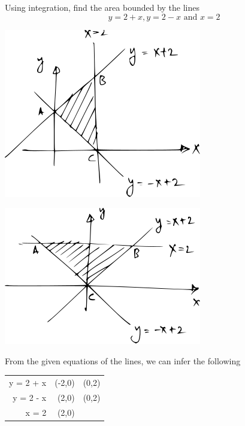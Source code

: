 \documentclass[14pt,fleqn]{extarticle}
\begin{document}
\begin{problem}
	\statement 
    
    Using integration, find the area bounded by the lines 
    \[\qquad  y = 2 + x, y = 2 - x\text{ and } x = 2 \]
          
    \begin{step}

	\begin{options}
	
	\correct

\begin{center}
\includegraphics[scale=1.4]{img_prefab-1.svg}
\end{center}
       
	\incorrect

\begin{center}
\includegraphics[scale=1.4]{img_prefab-2.svg}
\end{center}

	\end{options} 
     \reason 
     
     From the given equations of the lines, we can infer the following 
     \begin{center}
  \begin{tabular}{NNN}
   \toprule
        &  &   \\
   \midrule 
   y = 2 + x & (-2,0) & (0,2) \\
    \midrule 
    y = 2 - x & (2,0) & (0,2) \\
    \midrule 
    x = 2 & (2,0) &  \\ 
    \bottomrule
  \end{tabular}
\end{center}


\end{step}
\end{problem}
\end{document}

